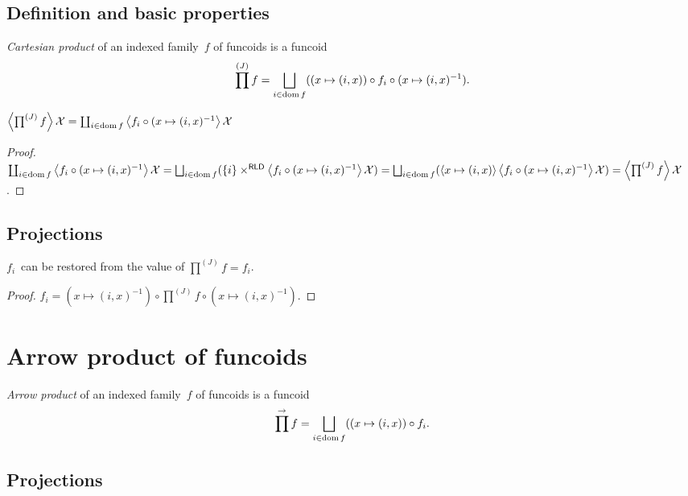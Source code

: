 \subsection{Definition and basic properties}

\begin{defn}
\emph{Cartesian product} of an indexed family~$f$ of funcoids is
a funcoid \[ \prod^{(J)} f=\bigsqcup_{i\in\dom f}((x\mapsto(i,x))\circ f_i\circ(x\mapsto(i,x)^{-1}). \]
\end{defn}

\begin{prop}
$\left\langle \prod^{(J)}f\right\rangle\mathcal{X}=\coprod_{i\in\operatorname{dom} f}\left\langle f_i\circ(x\mapsto(i,x)^{-1}\right\rangle\mathcal{X}$
\end{prop}

\begin{proof}
$\coprod_{i\in\dom f}\supfun{f_i\circ(x\mapsto(i,x)^{-1}}\mathcal{X}=
\bigsqcup_{i\in\dom f}(\{i\}\times^{\mathsf{RLD}}\supfun{f_i\circ(x\mapsto(i,x)^{-1}}\mathcal{X})=
\bigsqcup_{i\in\dom f}(\supfun{x\mapsto(i,x)}\supfun{f_i\circ(x\mapsto(i,x)^{-1}}\mathcal{X})=
\supfun{\prod^{(J)}f}\mathcal{X}$.
\end{proof}

\subsection{Projections}

\begin{thm}
$f_i$~can be restored from the value of $\prod^{(J)}f=f_i$.
\end{thm}

\begin{proof}
$f_i = (x\mapsto(i,x)^{-1})\circ\prod^{(J)}f\circ(x\mapsto(i,x)^{-1})$.
\end{proof}

\section{Arrow product of funcoids}

\begin{defn}
\emph{Arrow product} of an indexed family~$f$ of funcoids is
a funcoid \[ \prod^{\rightarrow} f=\bigsqcup_{i\in\dom f}((x\mapsto(i,x))\circ f_i. \]
\end{defn}

\subsection{Projections}

